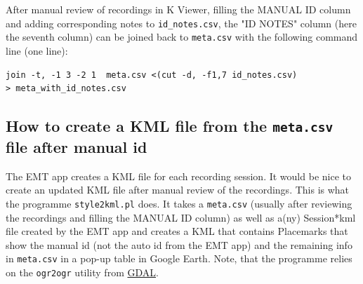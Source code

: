 \documentclass[English, 11pt, twoside, authoryear]{article}
\begin{document}
After manual review of recordings in \textsf{K} Viewer, filling the MANUAL ID column and adding corresponding notes to \texttt{id\_notes.csv}, the "ID NOTES" column (here the seventh column) can be joined back to \texttt{meta.csv} with the following command line (one line):

\begin{lstlisting}
join -t, -1 3 -2 1  meta.csv <(cut -d, -f1,7 id_notes.csv) 
> meta_with_id_notes.csv
\end{lstlisting}


%
%
\subsection{How to create a KML file from the \texttt{meta.csv} file after manual id}
%
%

The EMT app creates a KML file for each recording session. It would be nice to create an updated KML file after manual review of the recordings. This is what the programme \texttt{style2kml.pl} does. It takes a \texttt{meta.csv} (usually after reviewing the recordings and filling the MANUAL ID column) as well as a(ny) Session*kml file created by the EMT app and creates a KML that contains Placemarks that show the manual id (not the auto id from the EMT app) and the remaining info in \texttt{meta.csv} in a pop-up table in Google Earth. Note, that the programme relies on the \texttt{ogr2ogr} utility from \href{https://gdal.org/download.html}{GDAL}.
\end{document}
